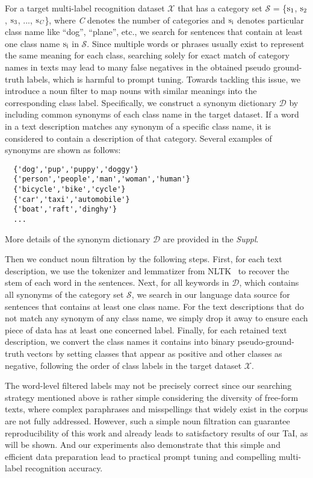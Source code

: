 \documentclass[10pt,twocolumn,letterpaper]{article}
\begin{document}
For a target multi-label recognition dataset $\mathcal{X}$ that has a category set $\mathcal{S}$ = \{$\rm s_1$, $\rm s_2$, $\rm s_3$, ..., $\rm s_{\textit {C}}$\}, where \textit{C} denotes the number of categories and $\rm s_i$ denotes particular class name like ``dog'', ``plane'', etc., we search for sentences that contain at least one class name $\rm s_i$ in $\mathcal{S}$. 
Since multiple words or phrases usually exist to represent the same meaning for each class, searching solely for exact match of category names in texts may lead to many false negatives in the obtained pseudo ground-truth labels, which is harmful to prompt tuning.
Towards tackling this issue, we introduce a noun filter to map nouns with similar meanings into the corresponding class label. Specifically, we construct a synonym dictionary $\mathcal{D}$ by including common synonyms of each class name in the target dataset. 
If a word in a text description matches any synonym of a specific class name, it is considered to contain a description of that category. Several examples of synonyms are shown as follows:
{\small\begin{verbatim}
  {'dog','pup','puppy','doggy'}
  {'person','people','man','woman','human'}
  {'bicycle','bike','cycle'}
  {'car','taxi','automobile'}
  {'boat','raft','dinghy'}
  ...
\end{verbatim}}
\noindent More details of the synonym dictionary $\mathcal{D}$ are provided in the \emph{Suppl}.

Then we conduct noun filtration by the following steps. First, for each text description, we use the tokenizer and lemmatizer from NLTK~\cite{bird2009natural} to recover the stem of each word in the sentences. Next, for all keywords in $\mathcal{D}$, which contains all synonyms of the category set $\mathcal{S}$, we search in our language data source for sentences that contains at least one class name. For the text descriptions that do not match any synonym of any class name, we simply drop it away to ensure each piece of data has at least one concerned label. Finally, for each retained text description, we convert the class names it contains into binary pseudo-ground-truth vectors by setting classes that appear as positive and other classes as negative, following the order of class labels in the target dataset $\mathcal{X}$.

The word-level filtered labels may not be precisely correct since our searching strategy mentioned above is rather simple considering the diversity of free-form texts, where complex paraphrases and misspellings that widely exist in the corpus are not fully addressed. 
However, such a simple noun filtration can guarantee reproducibility of this work and already leads to satisfactory results of our TaI, as will be shown.
And our experiments also demonstrate that this simple and efficient data preparation lead to practical prompt tuning and compelling multi-label recognition accuracy.
\end{document}
